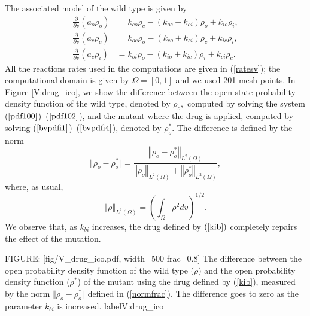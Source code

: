 The associated model of the wild type is given by
\begin{align}
\frac{\partial}{\partial v}\left(  a_{o}\rho_{o}\right)   &  =k_{co}\rho
_{c}-\left(  k_{oc}+k_{oi}\right)  \rho_{o}+k_{io}\rho_{i},\label{pdf100}\\
\frac{\partial}{\partial v}\left(  a_{c}\rho_{c}\right)   &  =k_{oc}\rho
_{o}-\left(  k_{co}+k_{ci}\right)  \rho_{c}+k_{ic}\rho_{i},\label{pdf101}\\
\frac{\partial}{\partial v}\left(  a_{c}\rho_{i}\right)   &  =k_{oi}\rho
_{o}-(k_{io}+k_{ic})\rho_{i}+k_{ci}\rho_{c}.\label{pdf102}
\end{align}
All the reactions rates used in the computations are given in (\ref{ratesv}); the computational domain
is given by $\Omega=[0,1]$ and we used 201 mesh points. 
In Figure \ref{V:drug_ico}, we show the difference between the open state probability density
function of the wild type, denoted by $\rho_{o},$ computed by solving the
system ($\ref{pdf100}$)--($\ref{pdf102}$), and the mutant where the
drug is applied, computed by solving ($\ref{bvpdfi1}$)--($\ref{bvpdfi4}$), denoted by $\rho_{o}^{\ast}.$ The difference is defined by the norm
\begin{equation}
\Vert  \rho_{o}-\rho_{o}^{\ast}\Vert=\frac{\left\Vert \rho_{o}-\rho_{o}^{\ast}\right\Vert _{L^{2}\left(
\Omega\right)  }}{\left\Vert \rho_{o}\right\Vert _{L^{2}\left(  \Omega\right)
}+\left\Vert \rho_{o}^{\ast}\right\Vert _{L^{2}\left(  \Omega\right)  }}, \label{normfrac}
\end{equation}
where, as usual,
\[
\left\Vert \rho\right\Vert _{L^{2}\left(  \Omega\right)  }=\left(
\int_{\Omega}\rho^{2}dv\right)  ^{1/2}.
\]
We observe that, as $k_{bi}$ increases, the drug defined by $\left(
\ref{kib}\right)  $ completely repairs the effect of the mutation.

FIGURE: [fig/V_drug_ico.pdf, width=500 frac=0.8] The difference between the open probability density function
of the wild type ($\rho$) and the open probability density function ($\rho^\ast$) of the mutant using the drug defined by
(\ref{kib}), measured by the norm $\Vert  \rho_{o}-\rho_{o}^{\ast}\Vert$ defined in  (\ref{normfrac}). The difference
goes to zero as the parameter $k_{bi}$ is increased. label{V:drug_ico}


